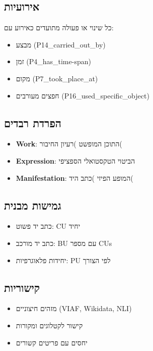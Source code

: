 \subsection{אירועיות}

כל שינוי או פעולה מתועדים כאירוע עם:
\begin{itemize}
\item מבצע \textenglish{(P14\_carried\_out\_by)}
\item זמן \textenglish{(P4\_has\_time-span)}
\item מקום \textenglish{(P7\_took\_place\_at)}
\item חפצים מעורבים \textenglish{(P16\_used\_specific\_object)}
\end{itemize}

\subsection{הפרדת רבדים}

\begin{itemize}
\item \textbf{Work}: התוכן המופשט )רעיון החיבור(
\item \textbf{Expression}: הביטוי הטקסטואלי הספציפי
\item \textbf{Manifestation}: המופע הפיזי )כתב היד(
\end{itemize}

\subsection{גמישות מבנית}

\begin{itemize}
\item כתב יד פשוט: CU יחיד
\item כתב יד מורכב: BU עם מספר CUs
\item יחידות פלאוגרפיות: PU לפי הצורך
\end{itemize}

\subsection{קישוריות}

\begin{itemize}
\item מזהים חיצוניים \textenglish{(VIAF, Wikidata, NLI)}
\item קישור לקטלוגים ומקורות
\item יחסים עם פריטים קשורים
\end{itemize}

